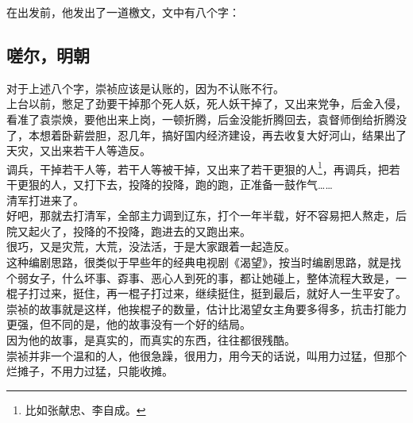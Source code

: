 \begin{multicols}{\theparacolNo}
在出发前，他发出了一道檄文，文中有八个字：
\begin{quote}
	\begin{spacing}{0.5}  %
		\textit{{\footnotesize
				\begin{description}
					\item[\textcolor{Gray}{\faQuoteRight}] 嗟尔明朝，气数已尽。
				\end{description}
		}}
	\end{spacing}
\end{quote}

\subsection{嗟尔，明朝}
对于上述八个字，崇祯应该是认账的，因为不认账不行。\\

上台以前，憋足了劲要干掉那个死人妖，死人妖干掉了，又出来党争，后金入侵，看准了袁崇焕，要他出来上岗，一顿折腾，后金没能折腾回去，袁督师倒给折腾没了，本想着卧薪尝胆，忍几年，搞好国内经济建设，再去收复大好河山，结果出了天灾，又出来若干人等造反。\\

调兵，干掉若干人等，若干人等被干掉，又出来了若干更狠的人\footnote{比如张献忠、李自成。}，再调兵，把若干更狠的人，又打下去，投降的投降，跑的跑，正准备一鼓作气……\\

清军打进来了。\\

好吧，那就去打清军，全部主力调到辽东，打个一年半载，好不容易把人熬走，后院又起火了，投降的不投降，跑进去的又跑出来。\\

很巧，又是灾荒，大荒，没法活，于是大家跟着一起造反。\\

这种编剧思路，很类似于早些年的经典电视剧《渴望》，按当时编剧思路，就是找个弱女子，什么坏事、孬事、恶心人到死的事，都让她碰上，整体流程大致是，一棍子打过来，挺住，再一棍子打过来，继续挺住，挺到最后，就好人一生平安了。\\

崇祯的故事就是这样，他挨棍子的数量，估计比渴望女主角要多得多，抗击打能力更强，但不同的是，他的故事没有一个好的结局。\\

因为他的故事，是真实的，而真实的东西，往往都很残酷。\\

崇祯并非一个温和的人，他很急躁，很用力，用今天的话说，叫用力过猛，但那个烂摊子，不用力过猛，只能收摊。\\


\end{multicols}
